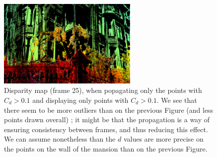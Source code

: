 \documentclass{article}
\theoremstyle{definition}
\begin{document}
\begin{figure}[ht]
  \centering
  \includegraphics[width=0.6\textwidth]{images/1520973007982_dmap_025.png}
  \caption{Disparity map (frame 25), when popagating only the points with $C_d > 0.1$ and displaying only points with $C_d > 0.1$. We see that there seem to be more outliers than on the previous Figure (and less points drawn overall) ; it might be that the propagation is a way of ensuring consistency between frames, and thus reducing this effect. We can assume nonetheless than the $d$ values are more precise on the points on the wall of the mansion than on the previous Figure.}
  \label{fig:propagation:disp}
\end{figure}





\clearpage


\end{document}
